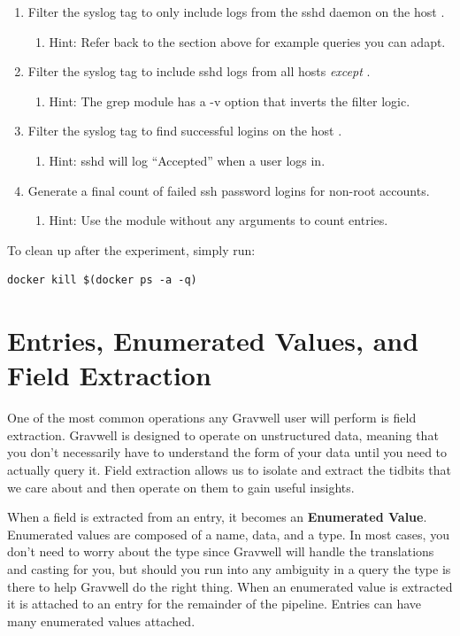 \begin{enumerate}
\item
  Filter the syslog tag to only include logs from the sshd daemon on the
  host .
	\begin{enumerate}
	\item
	  Hint: Refer back to the section above for example queries you can adapt.
	\end{enumerate}
\item
  Filter the syslog tag to include sshd logs from all hosts \emph{except} .
	\begin{enumerate}
	\item
	  Hint: The grep module has a -v option that inverts the filter logic.
	\end{enumerate}
\item
  Filter the syslog tag to find successful logins on the host .
	\begin{enumerate}
	\item
	  Hint: sshd will log ``Accepted'' when a user logs in.
	\end{enumerate}
\item
  Generate a final count of failed ssh password logins for non-root
  accounts.
	\begin{enumerate}
	\item
	  Hint: Use the  module without any arguments to count entries.
	\end{enumerate}
\end{enumerate}

To clean up after the experiment, simply run:

\begin{Verbatim}[breaklines=true]
docker kill $(docker ps -a -q)
\end{Verbatim}


\section{Entries, Enumerated Values, and Field Extraction}

One of the most common operations any Gravwell user will perform is
field extraction. Gravwell is designed to operate on unstructured data,
meaning that you don't necessarily have to understand the form of your data
until you need to actually query it. Field extraction allows us to
isolate and extract the tidbits that we care about and then operate on
them to gain useful insights.

When a field is extracted from an entry, it becomes an \textbf{Enumerated Value}.
Enumerated values are composed of a name, data, and a type. In
most cases, you don't need to worry about the type since Gravwell will
handle the translations and casting for you, but should you run into any
ambiguity in a query the type is there to help Gravwell do the right
thing. When an enumerated value is extracted it is attached to an
entry for the remainder of the pipeline. Entries can have many enumerated values attached.

